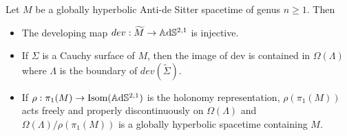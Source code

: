 \begin{proposition}\label{prop:GH_geometry}
    Let $M$ be a globally hyperbolic Anti-de Sitter spacetime of genus $n\geq 1$. Then
    \begin{itemize}
        \item The developing map $dev: \widetilde{M} \to\mathbb{A}\mathrm{d}\mathbb{S}^{2,1}$ is injective.
        \item If $\Sigma$ is a Cauchy surface of $M$, then the image of dev is contained in $\Omega(\Lambda)$ where $\Lambda$ is the boundary of $dev(\widetilde{\Sigma})$.
        \item If $\rho : \pi_1(M) \to \text{Isom}(\mathbb{A}\mathrm{d}\mathbb{S}^{2,1})$ is the holonomy representation, $\rho(\pi_1(M))$ acts freely and properly discontinuously on $\Omega(\Lambda)$ and $\Omega(\Lambda) / \rho(\pi_1(M))$ is a globally hyperbolic spacetime containing $M$.
    \end{itemize}
\end{proposition}
